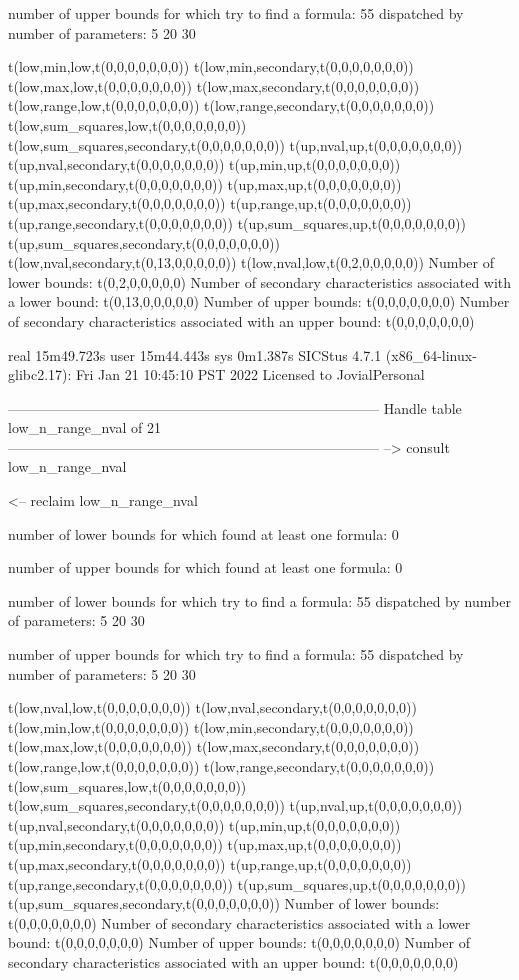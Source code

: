 number of upper bounds for which try to find a formula: 55
dispatched by number of parameters: 5  20  30

t(low,min,low,t(0,0,0,0,0,0,0))
t(low,min,secondary,t(0,0,0,0,0,0,0))
t(low,max,low,t(0,0,0,0,0,0,0))
t(low,max,secondary,t(0,0,0,0,0,0,0))
t(low,range,low,t(0,0,0,0,0,0,0))
t(low,range,secondary,t(0,0,0,0,0,0,0))
t(low,sum_squares,low,t(0,0,0,0,0,0,0))
t(low,sum_squares,secondary,t(0,0,0,0,0,0,0))
t(up,nval,up,t(0,0,0,0,0,0,0))
t(up,nval,secondary,t(0,0,0,0,0,0,0))
t(up,min,up,t(0,0,0,0,0,0,0))
t(up,min,secondary,t(0,0,0,0,0,0,0))
t(up,max,up,t(0,0,0,0,0,0,0))
t(up,max,secondary,t(0,0,0,0,0,0,0))
t(up,range,up,t(0,0,0,0,0,0,0))
t(up,range,secondary,t(0,0,0,0,0,0,0))
t(up,sum_squares,up,t(0,0,0,0,0,0,0))
t(up,sum_squares,secondary,t(0,0,0,0,0,0,0))
t(low,nval,secondary,t(0,13,0,0,0,0,0))
t(low,nval,low,t(0,2,0,0,0,0,0))
Number of lower bounds:                                             t(0,2,0,0,0,0,0)
Number of secondary characteristics associated with a lower bound:  t(0,13,0,0,0,0,0)
Number of upper bounds:                                             t(0,0,0,0,0,0,0)
Number of secondary characteristics associated with an upper bound: t(0,0,0,0,0,0,0)

real	15m49.723s
user	15m44.443s
sys	0m1.387s
SICStus 4.7.1 (x86_64-linux-glibc2.17): Fri Jan 21 10:45:10 PST 2022
Licensed to JovialPersonal


--------------------------------------------------------------------------------
Handle table low_n_range_nval of 21
--------------------------------------------------------------------------------
--> consult low_n_range_nval

<-- reclaim low_n_range_nval

number of lower bounds for which found at least one formula: 0

number of upper bounds for which found at least one formula: 0

number of lower bounds for which try to find a formula: 55
dispatched by number of parameters: 5  20  30

number of upper bounds for which try to find a formula: 55
dispatched by number of parameters: 5  20  30

t(low,nval,low,t(0,0,0,0,0,0,0))
t(low,nval,secondary,t(0,0,0,0,0,0,0))
t(low,min,low,t(0,0,0,0,0,0,0))
t(low,min,secondary,t(0,0,0,0,0,0,0))
t(low,max,low,t(0,0,0,0,0,0,0))
t(low,max,secondary,t(0,0,0,0,0,0,0))
t(low,range,low,t(0,0,0,0,0,0,0))
t(low,range,secondary,t(0,0,0,0,0,0,0))
t(low,sum_squares,low,t(0,0,0,0,0,0,0))
t(low,sum_squares,secondary,t(0,0,0,0,0,0,0))
t(up,nval,up,t(0,0,0,0,0,0,0))
t(up,nval,secondary,t(0,0,0,0,0,0,0))
t(up,min,up,t(0,0,0,0,0,0,0))
t(up,min,secondary,t(0,0,0,0,0,0,0))
t(up,max,up,t(0,0,0,0,0,0,0))
t(up,max,secondary,t(0,0,0,0,0,0,0))
t(up,range,up,t(0,0,0,0,0,0,0))
t(up,range,secondary,t(0,0,0,0,0,0,0))
t(up,sum_squares,up,t(0,0,0,0,0,0,0))
t(up,sum_squares,secondary,t(0,0,0,0,0,0,0))
Number of lower bounds:                                             t(0,0,0,0,0,0,0)
Number of secondary characteristics associated with a lower bound:  t(0,0,0,0,0,0,0)
Number of upper bounds:                                             t(0,0,0,0,0,0,0)
Number of secondary characteristics associated with an upper bound: t(0,0,0,0,0,0,0)

